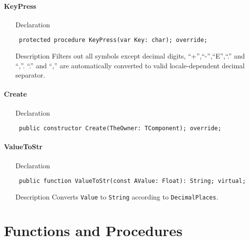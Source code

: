\documentclass[12pt,a4paper,oneside]{report}
\newcommand{\declarationitem}[1]{{\addfontfeatures{FakeSlant} #1}}
\newcommand{\descriptiontitle}[1]{{\addfontfeatures{FakeSlant}#1}}
\newcommand{\code}[1]{\texttt{#1}}
\begin{document}
\paragraph{KeyPress}\hspace*{\fill}
\label{lmnumericedits.TFloatEdit-KeyPress}
\begin{itemize}\item[\declarationitem{Declaration}\hfill]
\begin{flushleft}
\code{
protected procedure KeyPress(var Key: char); override;}
\end{flushleft}
\item[\descriptiontitle{Description}] Filters out all symbols except decimal digits, ``+'',``-'',``E'',``.'' and ``,''. ``.'' and ``,'' are automatically converted to valid locale-dependent decimal separator.
\end{itemize}
\paragraph{Create}\hspace*{\fill}
\label{lmnumericedits.TFloatEdit-Create}
\begin{itemize}\item[\declarationitem{Declaration}\hfill]
\begin{flushleft}
\code{
public constructor Create(TheOwner: TComponent); override;}
\end{flushleft}
\end{itemize}
\paragraph{ValueToStr}\hspace*{\fill}
\label{lmnumericedits.TFloatEdit-ValueToStr}
\begin{itemize}\item[\declarationitem{Declaration}\hfill]
\begin{flushleft}
\code{
public function ValueToStr(const AValue: Float): String; virtual;}
\end{flushleft}
\item[\descriptiontitle{Description}] Converts \code{Value} to \code{String} according to \code{DecimalPlaces}. 
\end{itemize}
\section{Functions and Procedures}
\end{document}
